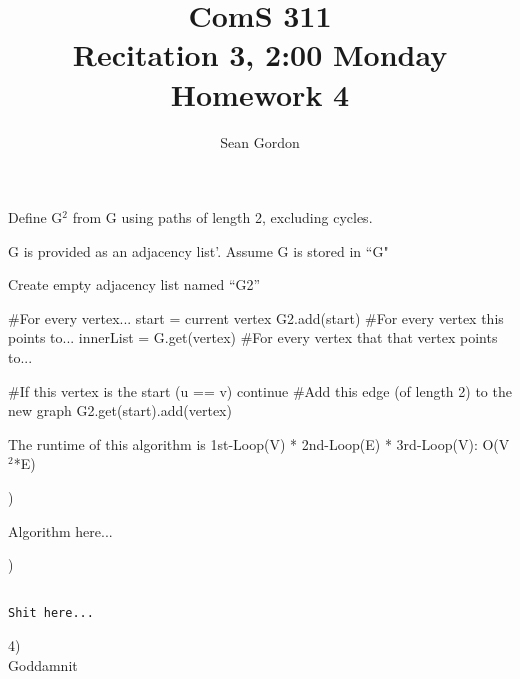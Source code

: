 \documentclass[12pt]{article}
\title{ComS 311\\Recitation 3, 2:00 Monday\\Homework 4}
\author{Sean Gordon}
\begin{document}
\maketitle


\begin{algorithm}
\caption{Define G$^2$ from G using paths of length 2, excluding cycles.}
\begin{algorithmic}
\REQUIRE G is provided as an adjacency list'.
\STATE Assume G is stored in ``G"

\STATE
\STATE Create empty adjacency list named ``G2''
\STATE

\STATE \#For every vertex...
\STATE start = current vertex
\STATE G2.add(start)
\STATE
\STATE \#For every vertex this points to...
\STATE innerList = G.get(vertex)
\STATE
\STATE \#For every vertex that that vertex points to...

\STATE
\STATE \#If this vertex is the start (u == v)
\STATE continue
\ENDIF
\STATE
\STATE \#Add this edge (of length 2) to the new graph
\STATE G2.get(start).add(vertex)

\ENDFOR
\ENDFOR
\ENDFOR
\STATE

\STATE The runtime of this algorithm is
\STATE 1st-Loop(V) * 2nd-Loop(E) * 3rd-Loop(V): O(V$^2$*E)
\end{algorithmic}
\end{algorithm}




\pagebreak


)

\begin{adjustwidth}{.25in}{0in}

Algorithm here...

\end{adjustwidth}


\pagebreak


)
\begin{lstlisting}[label=some-code]

Shit here...

\end{lstlisting}

\pagebreak

4) \\
Goddamnit


\end{document}
